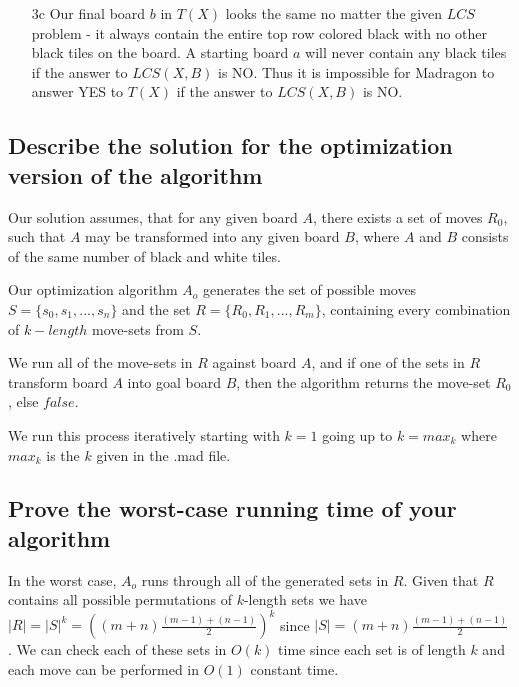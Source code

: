 \documentclass[12pt]{article}
\begin{document}
\begin{enumerate}
\begin{enumerate}
        \item[3c]
        Our final board $b$ in $T(X)$ looks the same no matter the given $LCS$ problem - it always contain the entire top row colored black with no other black tiles on the board. A starting board $a$ will never contain any black tiles if the answer to $LCS(X, B)$ is NO. Thus it is impossible for Madragon to answer YES to $T(X)$ if the answer to $LCS(X, B)$ is NO.

    \end{enumerate}

\end{enumerate}

\subsection{Describe the solution for the optimization version of the algorithm}
\label{sub:Describe the solution for the optimization version of the algorithm}

Our solution assumes, that for any given board $A$, there exists a set of moves $R_0$, such that $A$ may be transformed into any given board $B$, where $A$ and $B$ consists of the same number of black and white tiles.

Our optimization algorithm $A_o$ generates the set of possible moves $S = \{s_0, s_1, ...,s_n\}$ and the set $R = \{R_0, R_1, ..., R_m\}$, containing every combination of $k-length$ move-sets from $S$.

We run all of the move-sets in $R$ against board $A$, and if one of the sets in $R$ transform board $A$ into goal board $B$, then the algorithm returns the move-set $R_0$, else $false$.

We run this process iteratively starting with $k = 1$ going up to $k = max_k$ where $max_k$ is the $k$ given in the .mad file.

\subsection{Prove the worst-case running time of your algorithm}
\label{sub:Prove the worst-case running time of your algorithm}

In the worst case, $A_o$ runs through all of the generated sets in $R$. Given that $R$ contains all possible permutations of $k$-length sets we have $|R| = |S|^k = ((m+n)\frac{(m-1)+(n-1)}{2})^k$ since $|S| = (m+n)\frac{(m-1)+(n-1)}{2}$. We can check each of these sets in $O(k)$ time since each set is of length $k$ and each move can be performed in $O(1)$ constant time.
\end{document}
